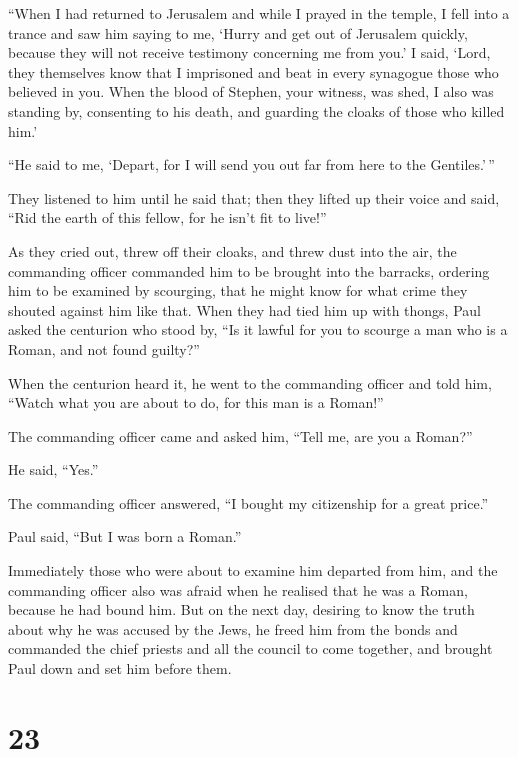  ``When I had returned to Jerusalem and while I prayed in
the temple, I fell into a trance  and saw him saying to me,
`Hurry and get out of Jerusalem quickly, because they will not receive
testimony concerning me from you.'  I said, `Lord, they
themselves know that I imprisoned and beat in every synagogue those who
believed in you.  When the blood of Stephen, your witness,
was shed, I also was standing by, consenting to his death, and guarding
the cloaks of those who killed him.'

 ``He said to me, `Depart, for I will send you out far from
here to the Gentiles.'\,''

 They listened to him until he said that; then they lifted
up their voice and said, ``Rid the earth of this fellow, for he isn't
fit to live!''

 As they cried out, threw off their cloaks, and threw dust
into the air,  the commanding officer commanded him to be
brought into the barracks, ordering him to be examined by scourging,
that he might know for what crime they shouted against him like that.
 When they had tied him up with thongs, Paul asked the
centurion who stood by, ``Is it lawful for you to scourge a man who is a
Roman, and not found guilty?''

 When the centurion heard it, he went to the commanding
officer and told him, ``Watch what you are about to do, for this man is
a Roman!''

 The commanding officer came and asked him, ``Tell me, are
you a Roman?''

He said, ``Yes.''

 The commanding officer answered, ``I bought my citizenship
for a great price.''

Paul said, ``But I was born a Roman.''

 Immediately those who were about to examine him departed
from him, and the commanding officer also was afraid when he realised
that he was a Roman, because he had bound him.  But on the
next day, desiring to know the truth about why he was accused by the
Jews, he freed him from the bonds and commanded the chief priests and
all the council to come together, and brought Paul down and set him
before them.

\hypertarget{section-22}{%
\section{23}\label{section-22}}

